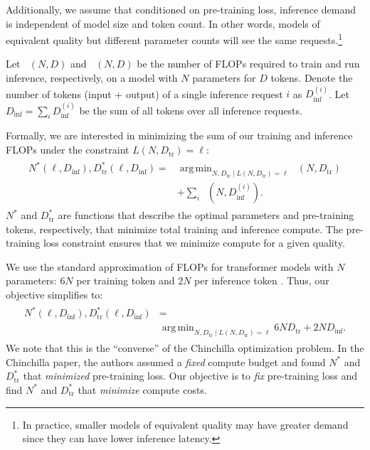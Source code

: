 \documentclass{article}
\theoremstyle{plain}
\theoremstyle{definition}
\theoremstyle{remark}
\DeclareMathOperator*{\argmin}{arg\,min}
\newcommand{\Dtr}{D_{\text{tr}}}
\newcommand{\Dtropt}{D_{\text{tr}}^*}
\newcommand{\Dinfi}{D_{\text{inf}}}
\DeclareMathOperator*{\Tf}{T_{\text{FLOPs}}}
\DeclareMathOperator*{\If}{I_{\text{FLOPs}}}
\begin{document}
Additionally, we assume that conditioned on pre-training loss, inference demand is independent of model size and token count. In other words, models of equivalent quality but different parameter counts will see the same requests.\footnote{In practice, smaller models of equivalent quality may have greater demand since they can have lower inference latency.}



Let $\Tf(N, D)$ and $\If(N, D)$ be the number of FLOPs required to train and run inference, respectively, on a model with $N$ parameters for $D$ tokens. Denote the number of tokens (input + output) of a single inference request $i$ as $D_{\text{inf}}^{(i)}$. Let $\Dinfi = \sum_{i} D_{\text{inf}}^{(i)}$ be the sum of all tokens over all inference requests.

Formally, we are interested in minimizing the sum of our training and inference FLOPs under the constraint $L(N, \Dtr) = \ell$:
\begin{align}
\label{eq:1}
\begin{split}
N^*(\ell, \Dinfi), D_{\text{tr}}^{*}(\ell,\Dinfi) = &\argmin_{N, \Dtr \mid L(N, \Dtr) = \ell} \Tf(N, \Dtr)\\
&+ \sum_{i}^{} \If(N, \Dinfi^{(i)}).
\end{split}
\end{align}
$N^*$ and $D_{\text{tr}}^{*}$ are functions that describe the optimal parameters and pre-training tokens, respectively, that minimize total training and inference compute. The pre-training loss constraint ensures that we minimize compute for a given quality.

We use the standard approximation of FLOPs for transformer models with $N$ parameters: $6N$ per training token and $2N$ per inference token \citep{scalinglaws}. Thus, our objective simplifies to:
\begin{align}
\label{eq:2}
\begin{split}
N^*(\ell, \Dinfi), \Dtropt(\ell, \Dinfi) &=\\
&\argmin_{N, \Dtr \mid L(N, \Dtr) = \ell} 6N\Dtr + 2N\Dinfi.
\end{split}
\end{align}
We note that this is the ``converse'' of the Chinchilla optimization problem. In the Chinchilla paper, the authors assumed a \textit{fixed} compute budget and found $N^*$ and $\Dtropt$ that \textit{minimized} pre-training loss. Our objective is to \textit{fix} pre-training loss and find $N^*$ and $\Dtropt$ that \textit{minimize} compute costs.
\end{document}
